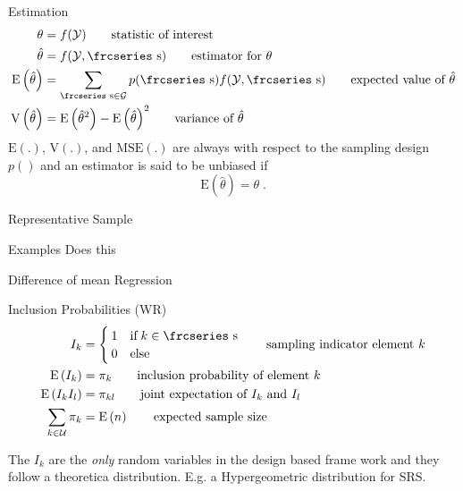 \documentclass{beamer}\usepackage[]{graphicx}\usepackage[]{color}
\newcommand{\eqname}[1]{\tag*{#1}} %
\newcommand{\textfrc}[1]{{\frcseries#1}}
\newcommand{\mathfrc}[1]{\text{\textfrc{#1}}}
\newcommand{\E}[1]{\text{E}\left(#1\right)}
\newcommand{\V}[1]{\text{V}\left(#1\right)}
\newcommand{\MSE}[1]{\text{MSE}\left(#1\right)}
\begin{document}
\begin{frame}{Estimation}
\begin{align}
 \theta       & = f(\mathcal{Y})  \eqname{statistic of interest} \\
 \hat{\theta} & = f(\mathcal{Y}, \mathfrc{s} )  \eqname{estimator for $\theta$} \\
 \E{\hat{\theta}} & = \sum_{\mathfrc{s} \in \mathcal{G}} p(\mathfrc{s}) f(\mathcal{Y}, \mathfrc{s} )   \eqname{expected value of $\hat{\theta}$} \\
 \V{\hat{\theta}}   & =  \E{\hat{\theta}^2} -  {\E{\hat{\theta}}}^2 \eqname{variance of  $\hat{\theta}$} 
\end{align}
 $\E{.}$, $\V{.}$, and $\MSE{.}$ are always with respect to the sampling design $p()$ and
 an estimator is said to be unbiased if
 $$ \E{\hat{\theta}} = \theta\;. $$
\end{frame}


\begin{frame}{Representative Sample}



\end{frame}

\begin{frame}{Examples}
Does this

Difference of mean
Regression

\end{frame}


\begin{frame}{Inclusion Probabilities (WR)}
\begin{align}
 I_k   &=   \begin{cases}   1  & \text{if}\; k \in \mathfrc{s} \\
                            0  & \text{else}  
          \end{cases}   \eqname{sampling indicator element $k$} \\
\E{I_k}     &  =   \pi_k    \eqname{inclusion probability of element $k$ } \\
\E{I_k I_l} &  =   \pi_{kl}  \eqname{joint expectation of $I_k$ and $I_l$} \\
\sum_{k \in \mathcal{U}}\pi_k & = \E{n} \eqname{expected sample size}
\end{align}

The $I_k$ are the \emph{only} random variables in the design based frame work and they follow a theoretica distribution. E.g. a Hypergeometric distribution for SRS. 

\end{frame}
\end{document}
